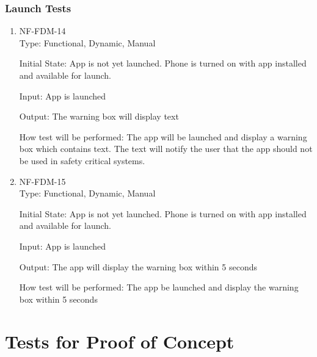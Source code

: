 \documentclass[12pt, titlepage]{article}
\begin{document}
\subsubsection{Launch Tests}
\begin{enumerate}
\item{NF-FDM-14\\}
Type: Functional, Dynamic, Manual
					
Initial State: 
App is not yet launched. Phone is turned on with app installed and available for launch.
					
Input: 
App is launched
					
Output: 
The warning box will display text
					
How test will be performed: 
The app will be launched and display a warning box which contains text. The text will notify the user that the app should not be used in safety critical systems.

\item{NF-FDM-15\\}
Type: Functional, Dynamic, Manual
					
Initial State: 
App is not yet launched. Phone is turned on with app installed and available for launch.
					
Input: 
App is launched
					
Output: 
The app will display the warning box within 5 seconds
					
How test will be performed: 
The app be launched and display the warning box within 5 seconds


\end{enumerate}




\section{Tests for Proof of Concept}
\end{document}
